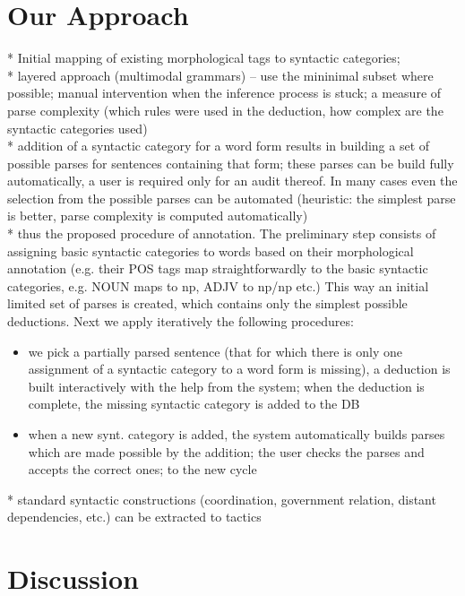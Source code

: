 \documentclass[a4paper]{article}
\theoremstyle{example-style}
\begin{document}
\section{Our Approach}

  * Initial mapping of existing morphological tags to syntactic categories; \\
  
  * layered approach (multimodal grammars) -- use the mininimal subset where possible; manual intervention when 
    the inference process is stuck; a measure of parse complexity (which rules were used in the deduction, how complex are the syntactic categories used) \\
    
  * addition of a syntactic category for a word form results in building a set of possible parses for sentences containing that form; these parses can be build fully automatically, a user is required only for an audit thereof. In many cases even the selection from the possible parses can be automated (heuristic: the simplest parse is better, parse complexity is computed automatically) \\
  
  * thus the proposed procedure of annotation. The preliminary step consists of assigning basic syntactic categories to words based on their morphological annotation (e.g. their POS tags map straightforwardly to the basic syntactic categories, e.g. NOUN maps to np, ADJV to np/np etc.) This way an initial limited set of parses is created, which contains only the simplest possible deductions. Next we apply iteratively the following procedures:
  \begin{itemize}
  	\item we pick a partially parsed sentence (that for which there is only one assignment of a syntactic category to a word form is missing), a deduction is built interactively with the help from the system; when the deduction is complete, the missing syntactic category is added to the DB
  	\item when a new synt. category is added, the system automatically builds parses which are made possible by the addition; the user checks the parses and accepts the correct ones; to the new cycle
  \end{itemize} 
  
  * standard syntactic constructions (coordination, government relation, distant dependencies, etc.) can be extracted to tactics 
    

\section{Discussion}
\end{document}
